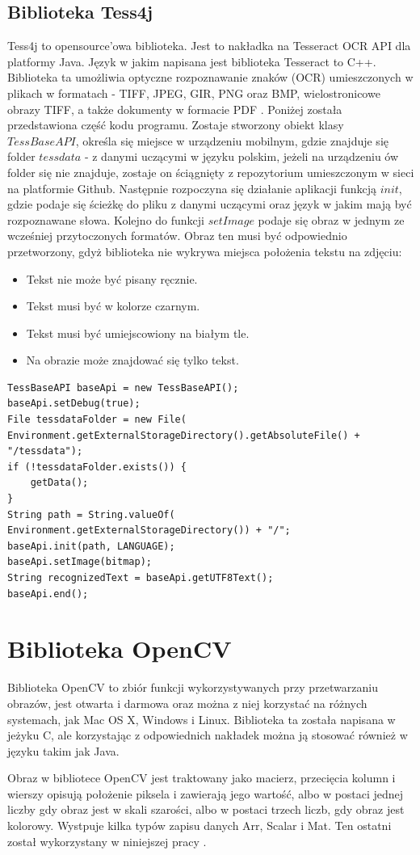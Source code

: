 \documentclass[eng,oneside]{mgr}
\begin{document}
\subsection{Biblioteka Tess4j}
Tess4j to opensource'owa biblioteka. Jest to nakładka na Tesseract OCR API dla platformy Java. Język w jakim napisana jest biblioteka Tesseract to C++. Biblioteka ta umożliwia optyczne rozpoznawanie znaków (OCR) umieszczonych w plikach w formatach - TIFF, JPEG, GIR, PNG oraz BMP, wielostronicowe obrazy TIFF, a także dokumenty w formacie PDF \cite{tess4j}.
Poniżej została przedstawiona część kodu programu. Zostaje stworzony obiekt klasy $TessBaseAPI$, określa się miejsce w urządzeniu mobilnym, gdzie znajduje się folder $tessdata$ - z danymi uczącymi w języku polskim, jeżeli na urządzeniu ów folder się nie znajduje, zostaje on ściągnięty z repozytorium umieszczonym w sieci na platformie Github. Następnie rozpoczyna się działanie aplikacji funkcją $init$, gdzie podaje się ścieżkę do pliku z danymi uczącymi oraz język w jakim mają być rozpoznawane słowa. Kolejno do funkcji $setImage$ podaje się obraz w jednym ze wcześniej przytoczonych formatów. Obraz ten musi być odpowiednio przetworzony, gdyż biblioteka nie wykrywa miejsca położenia tekstu na zdjęciu:
\begin{itemize}
\item Tekst nie może być pisany ręcznie.
\item Tekst musi być w kolorze czarnym.
\item Tekst musi być umiejscowiony na białym tle.
\item Na obrazie może znajdować się tylko tekst.
\end{itemize}

\begin{lstlisting}[caption={Kod programu, odpowiadający za odwołanie  do zewnętrznego API Tess4j}]
TessBaseAPI baseApi = new TessBaseAPI();
baseApi.setDebug(true);
File tessdataFolder = new File(
Environment.getExternalStorageDirectory().getAbsoluteFile() + "/tessdata");
if (!tessdataFolder.exists()) {
    getData();
}
String path = String.valueOf(
Environment.getExternalStorageDirectory()) + "/";
baseApi.init(path, LANGUAGE);
baseApi.setImage(bitmap);
String recognizedText = baseApi.getUTF8Text();
baseApi.end();
\end{lstlisting}
\section{Biblioteka OpenCV}
Biblioteka OpenCV to zbiór funkcji wykorzystywanych przy przetwarzaniu obrazów, jest otwarta i darmowa oraz można z niej korzystać na różnych systemach, jak Mac OS X, Windows i Linux. Biblioteka ta została napisana w jeżyku C, ale korzystając z odpowiednich nakładek można ją stosować również w języku takim jak Java.
\par Obraz w bibliotece OpenCV jest traktowany jako macierz, przecięcia kolumn i wierszy opisują położenie piksela i zawierają jego wartość, albo w postaci jednej liczby gdy obraz jest w skali szarości, albo w postaci trzech liczb, gdy obraz jest kolorowy. Wystpuje kilka typów zapisu danych Arr, Scalar i Mat. Ten ostatni został wykorzystany w niniejszej pracy \cite{opencv}.
\end{document}
